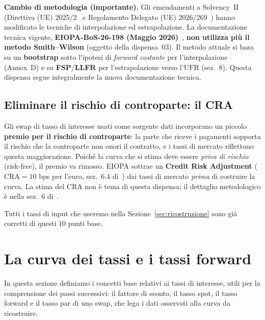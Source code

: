 \documentclass[11pt,a4paper]{article}
\theoremstyle{plain}
\theoremstyle{definition}
\theoremstyle{remark}
\newcommand{\UFR}{\mathrm{UFR}}
\newcommand{\CRA}{\mathrm{CRA}}
\begin{document}
\begin{warningbox}
\textbf{Cambio di metodologia (importante).} Gli emendamenti a Solvency~II
(Direttiva (UE) 2025/2~\cite{dir2025} e Regolamento Delegato (UE) 2026/269~\cite{reg2026})
hanno modificato le tecniche di interpolazione ed estrapolazione. La documentazione tecnica
vigente, \textbf{EIOPA-BoS-26-198 (Maggio 2026)}~\cite{eiopa2026}, \textbf{non utilizza pi\`u
il metodo Smith--Wilson} (oggetto della dispensa~03). Il metodo attuale si basa su un
\textbf{bootstrap} sotto l'ipotesi di \emph{forward costante} per l'interpolazione (Annex~D)
e su \textbf{FSP}/\textbf{LLFR} per l'estrapolazione verso l'$\UFR$ (sez.~8). Questa dispensa
segue integralmente la nuova documentazione tecnica.
\end{warningbox}

\subsection{Eliminare il rischio di controparte: il CRA}
\label{sec:cra}

Gli swap di tasso di interesse usati come sorgente dati incorporano un piccolo \textbf{premio
per il rischio di controparte}: la parte che riceve i pagamenti sopporta il rischio che la
controparte non onori il contratto, e i tassi di mercato riflettono questa maggiorazione.
Poich\'e la curva che si stima deve essere \emph{priva di rischio} (risk-free), il premio va
rimosso. EIOPA sottrae un \textbf{Credit Risk Adjustment} ($\CRA = 10$ bps per l'euro,
sez.~6.4 di~\cite{eiopa2026}) dai tassi di mercato \emph{prima} di costruire la curva.
La stima del $\CRA$ non \`e tema di questa dispensa; il dettaglio metodologico \`e
nella sez.~6 di~\cite{eiopa2026}.

Tutti i tassi di input che useremo nella Sezione~\ref{sec:ricostruzione} sono gi\`a corretti
di questi 10 punti base.

\section{La curva dei tassi e i tassi forward}
\label{sec:tassi}

In questa sezione definiamo i concetti base relativi ai tassi di interesse, utili per la
comprensione dei passi successivi: il fattore di sconto, il tasso spot, il tasso forward e il
tasso par di uno swap, che lega i dati osservati alla curva da ricostruire.
\end{document}
